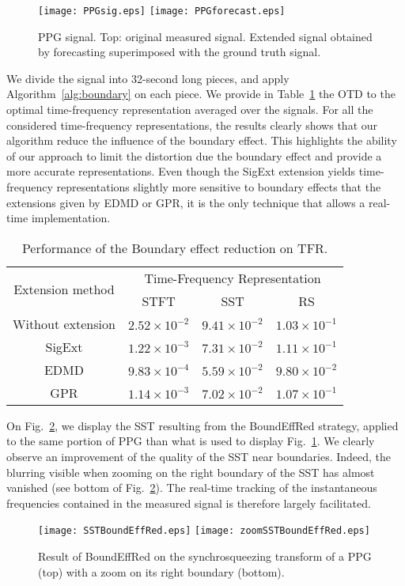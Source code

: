\begin{figure}
\texttt{[image: PPGsig.eps]}
\texttt{[image: PPGforecast.eps]}
\caption{PPG signal. Top: original measured signal. Extended signal obtained by forecasting superimposed with the ground truth signal.}
\label{fig:ppg}
\end{figure}

We divide the signal into 32-second long pieces, and apply Algorithm~\ref{alg:boundary} on each piece. We provide in Table~\ref{tab:otd.ppg} the OTD to the optimal time-frequency representation averaged over the signals. For all the considered time-frequency representations, the results clearly shows that our algorithm reduce the influence of the boundary effect. This highlights the ability of our approach to limit the distortion due the boundary effect and provide a more accurate representations. Even though the {\sc SigExt} extension yields time-frequency  representations slightly more sensitive to boundary effects that the extensions given by EDMD or GPR, it is the only technique that allows a real-time implementation.

\begin{table}
\centering
\caption{Performance of the Boundary effect reduction on TFR.}
\begin{tabular}{|c||c|c|c|}
  \hline
   \multirow{2}{*}{Extension method} & \multicolumn{3}{c|}{Time-Frequency Representation} \\
   \cline{2-4}
      & STFT & SST & RS\\
   \hhline{|=#=|=|=|}
   Without extension & $2.52\times 10^{-2}$ & $9.41\times 10^{-2}$ & $1.03\times 10^{-1}$ \\
   \hline
   {\sf SigExt} & $1.22\times 10^{-3}$ & $7.31\times 10^{-2}$ & $1.11\times 10^{-1}$ \\
   \hline
   EDMD & $9.83\times 10^{-4}$ & $5.59\times 10^{-2}$ & $9.80\times 10^{-2}$ \\
   \hline
   GPR & $1.14\times 10^{-3}$ & $7.02\times 10^{-2}$ & $1.07\times 10^{-1}$ \\
   \hline
\end{tabular}
\label{tab:otd.ppg}
\end{table}

On Fig.~\ref{fig:ppg.boundeffred}, we display the SST resulting from the {\sf BoundEffRed} strategy, applied to the same portion of PPG than what is used to display Fig.~\ref{fig:ppg}. We clearly observe an improvement of the quality of the SST near boundaries. Indeed, the blurring visible when zooming on the right boundary of the SST has almost vanished (see bottom of Fig.~\ref{fig:ppg.boundeffred}). The real-time tracking of the instantaneous frequencies contained in the measured signal is therefore largely facilitated.   

\begin{figure}
\centering
\texttt{[image: SSTBoundEffRed.eps]}
\texttt{[image: zoomSSTBoundEffRed.eps]}
\caption{Result of {\sf BoundEffRed} on the synchrosqueezing transform of a PPG (top) with a zoom on its right boundary (bottom). }
\label{fig:ppg.boundeffred}
\end{figure} 